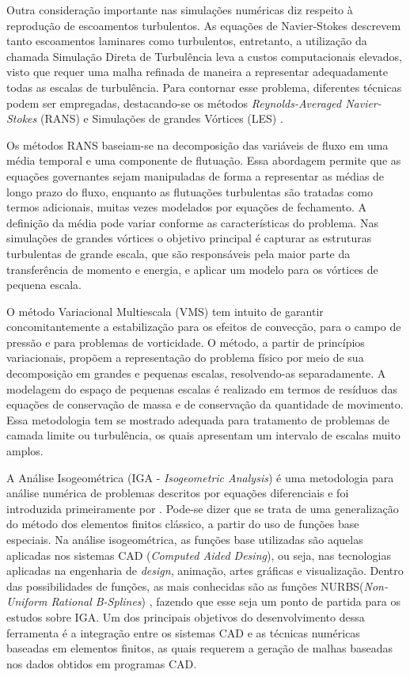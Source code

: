 \documentclass[tese_patricia.tex]{subfiles}
\begin{document}
Outra consideração importante nas simulações numéricas diz respeito à reprodução de escoamentos turbulentos. As equações de Navier-Stokes descrevem tanto escoamentos laminares como turbulentos, entretanto, a utilização da chamada Simulação Direta de Turbulência leva a custos computacionais elevados, visto que requer uma malha refinada de maneira a representar adequadamente todas as escalas de turbulência. Para contornar esse problema, diferentes técnicas podem ser empregadas, destacando-se os métodos \textit{Reynolds-Averaged Navier-Stokes} (RANS) \cite{Speziale1991,Alfonsi2009} e Simulações de grandes Vórtices (LES) \cite{LaunderS:1972,Germano1991,Wilcox:1993,PIOMELLI1999}.

Os métodos RANS baseiam-se na decomposição das variáveis de fluxo em uma média temporal e uma componente de flutuação. Essa abordagem permite que as equações governantes sejam manipuladas de forma a representar as médias de longo prazo do fluxo, enquanto as flutuações turbulentas são tratadas como termos adicionais, muitas vezes modelados por equações de fechamento. A definição da média pode variar conforme as características do problema. Nas simulações de grandes vórtices o objetivo principal é capturar as estruturas turbulentas de grande escala, que são responsáveis pela maior parte da transferência de momento e energia, e aplicar um modelo para os vórtices de pequena escala. 

O método Variacional Multiescala (VMS) \cite{Hughes:1995,Hughesetal:1998,Hughesetal:2001,BazilevsTT:2013} tem intuito de garantir concomitantemente a estabilização para os efeitos de convecção, para o campo de pressão e para problemas de vorticidade. O método, a partir de princípios variacionais, propõem a representação do problema físico por meio de sua decomposição em grandes e pequenas escalas, resolvendo-as separadamente.  A modelagem do espaço de pequenas escalas é realizado em termos de resíduos das equações de conservação de massa e de conservação da quantidade de movimento. Essa metodologia tem se mostrado adequada para tratamento de problemas de camada limite ou turbulência, os quais apresentam um intervalo de escalas muito amplos.

A Análise Isogeométrica (IGA - \textit{Isogeometric Analysis}) é uma metodologia para análise numérica de problemas descritos por equações diferenciais e foi introduzida primeiramente por . Pode-se dizer que se trata de uma generalização do método dos elementos finitos clássico, a partir do uso de funções base especiais. Na análise isogeométrica, as funções base utilizadas são aquelas aplicadas nos sistemas CAD (\textit{Computed Aided Desing}), ou seja, nas tecnologias aplicadas na engenharia de \textit{design}, animação, artes gráficas e visualização.  Dentro das possibilidades de funções, as mais conhecidas são as funções NURBS(\textit{Non-Uniform Rational B-Splines}) \cite{PiegT:1996}, fazendo que esse seja um ponto de partida para os estudos sobre IGA. Um dos principais objetivos do desenvolvimento dessa ferramenta é a integração entre os sistemas CAD e as técnicas numéricas baseadas em elementos finitos, as quais requerem a geração de malhas baseadas nos dados obtidos em programas CAD. 
\end{document}
